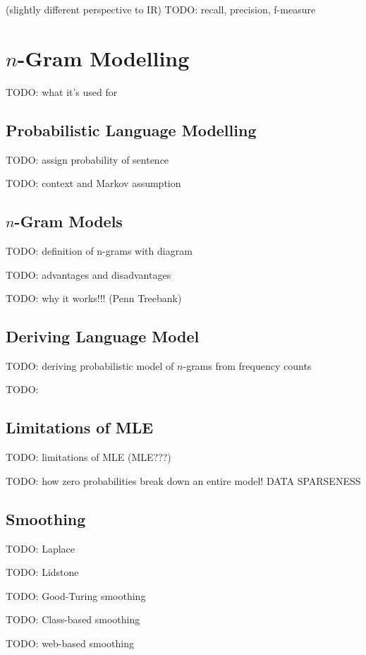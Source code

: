 \documentclass{article}
\begin{document}
(slightly different perspective to IR)
TODO: recall, precision, f-measure


\section{$n$-Gram Modelling}

TODO: what it's used for

\subsection{Probabilistic Language Modelling}

TODO: assign probability of sentence

TODO: context and Markov assumption

\subsection{$n$-Gram Models}

TODO: definition of n-grams with diagram

TODO: advantages and disadvantages

TODO: why it works!!! (Penn Treebank)

\subsection{Deriving Language Model}

TODO: deriving probabilistic model of $n$-grams from frequency counts

TODO:

\subsection{Limitations of MLE}

TODO: limitations of MLE (MLE???)

TODO: how zero probabilities break down an entire model! DATA SPARSENESS

\subsection{Smoothing}

TODO: Laplace

TODO: Lidstone

TODO: Good-Turing smoothing

TODO: Class-based smoothing

TODO: web-based smoothing
\end{document}
